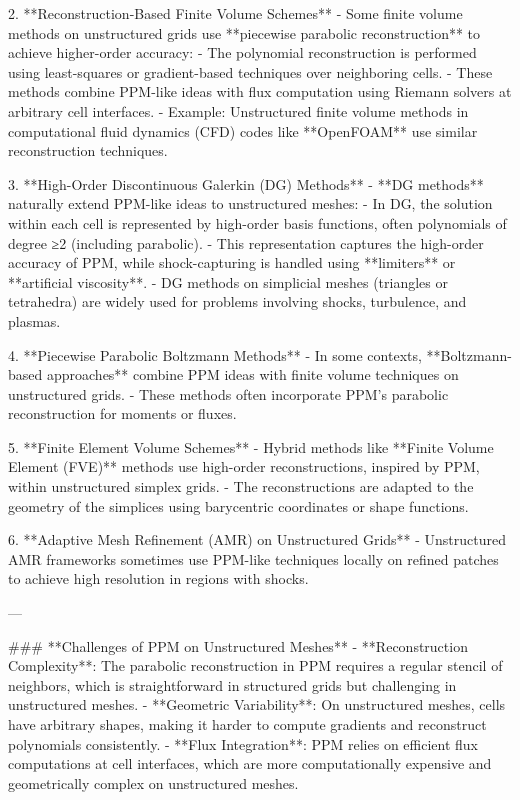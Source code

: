 2. **Reconstruction-Based Finite Volume Schemes**
   - Some finite volume methods on unstructured grids use **piecewise parabolic reconstruction** to achieve higher-order accuracy:
     - The polynomial reconstruction is performed using least-squares or gradient-based techniques over neighboring cells.
     - These methods combine PPM-like ideas with flux computation using Riemann solvers at arbitrary cell interfaces.
   - Example: Unstructured finite volume methods in computational fluid dynamics (CFD) codes like **OpenFOAM** use similar reconstruction techniques.

3. **High-Order Discontinuous Galerkin (DG) Methods**
   - **DG methods** naturally extend PPM-like ideas to unstructured meshes:
     - In DG, the solution within each cell is represented by high-order basis functions, often polynomials of degree ≥2 (including parabolic).
     - This representation captures the high-order accuracy of PPM, while shock-capturing is handled using **limiters** or **artificial viscosity**.
   - DG methods on simplicial meshes (triangles or tetrahedra) are widely used for problems involving shocks, turbulence, and plasmas.

4. **Piecewise Parabolic Boltzmann Methods**
   - In some contexts, **Boltzmann-based approaches** combine PPM ideas with finite volume techniques on unstructured grids.
   - These methods often incorporate PPM's parabolic reconstruction for moments or fluxes.

5. **Finite Element Volume Schemes**
   - Hybrid methods like **Finite Volume Element (FVE)** methods use high-order reconstructions, inspired by PPM, within unstructured simplex grids.
   - The reconstructions are adapted to the geometry of the simplices using barycentric coordinates or shape functions.

6. **Adaptive Mesh Refinement (AMR) on Unstructured Grids**
   - Unstructured AMR frameworks sometimes use PPM-like techniques locally on refined patches to achieve high resolution in regions with shocks.

---

### **Challenges of PPM on Unstructured Meshes**
- **Reconstruction Complexity**: The parabolic reconstruction in PPM requires a regular stencil of neighbors, which is straightforward in structured grids but challenging in unstructured meshes.
- **Geometric Variability**: On unstructured meshes, cells have arbitrary shapes, making it harder to compute gradients and reconstruct polynomials consistently.
- **Flux Integration**: PPM relies on efficient flux computations at cell interfaces, which are more computationally expensive and geometrically complex on unstructured meshes.

